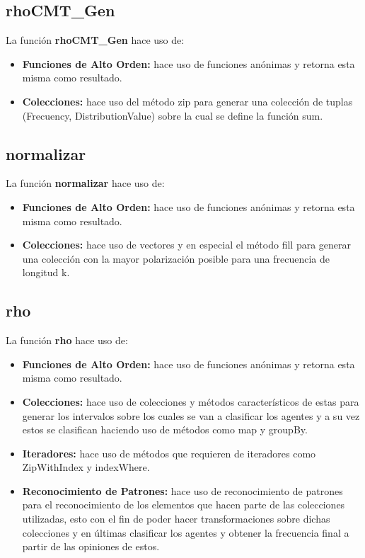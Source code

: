 \documentclass{article}
\begin{document}
    \subsection{rhoCMT\_Gen}
    La función \textbf{rhoCMT\_Gen} hace uso de:

    \begin{itemize}
      \item \textbf{Funciones de Alto Orden:} hace uso de funciones anónimas y retorna esta misma como resultado.
      \item \textbf{Colecciones:} hace uso del método zip para generar una colección de tuplas (Frecuency, DistributionValue) sobre la cual se define la función sum.
    \end{itemize}

    \subsection{normalizar}
    La función \textbf{normalizar} hace uso de:

    \begin{itemize}
      \item \textbf{Funciones de Alto Orden:} hace uso de funciones anónimas y retorna esta misma como resultado.
      \item \textbf{Colecciones:} hace uso de vectores y en especial el método fill para generar una colección con la mayor polarización posible para una frecuencia de longitud k.
    \end{itemize}

    \subsection{rho}
    La función \textbf{rho} hace uso de:

    \begin{itemize}
      \item \textbf{Funciones de Alto Orden:} hace uso de funciones anónimas y retorna esta misma como resultado.
      \item \textbf{Colecciones:} hace uso de colecciones y métodos característicos de estas para generar los intervalos sobre los cuales se van a clasificar los agentes y a su vez estos se clasifican haciendo uso de métodos como map y groupBy.
      \item \textbf{Iteradores:} hace uso de métodos que requieren de iteradores como ZipWithIndex y indexWhere.
      \item \textbf{Reconocimiento de Patrones:} hace uso de reconocimiento de patrones para el reconocimiento de los elementos que hacen parte de las colecciones utilizadas, esto con el fin de poder hacer transformaciones sobre dichas colecciones y en últimas clasificar los agentes y obtener la frecuencia final a partir de las opiniones de estos.
    \end{itemize}
\end{document}
